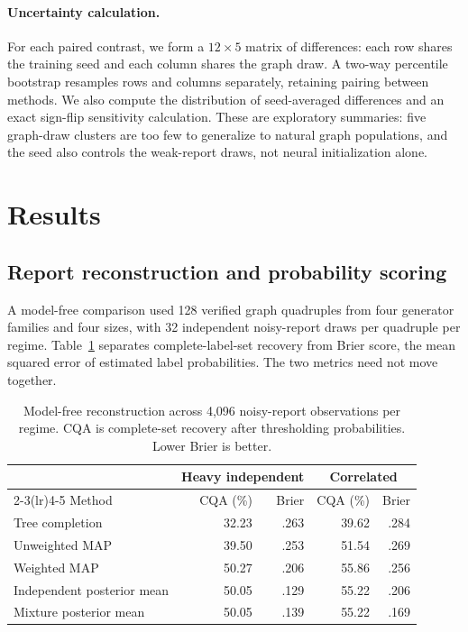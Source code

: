 \documentclass[10pt]{article}
\begin{document}
\paragraph{Uncertainty calculation.} For each paired contrast, we form a $12\times 5$ matrix of differences: each row shares the training seed and each column shares the graph draw. A two-way percentile bootstrap resamples rows and columns separately, retaining pairing between methods. We also compute the distribution of seed-averaged differences and an exact sign-flip sensitivity calculation. These are exploratory summaries: five graph-draw clusters are too few to generalize to natural graph populations, and the seed also controls the weak-report draws, not neural initialization alone.

\section{Results}
\subsection{Report reconstruction and probability scoring}
A model-free comparison used 128 verified graph quadruples from four generator families and four sizes, with 32 independent noisy-report draws per quadruple per regime. Table~\ref{tab:decode} separates complete-label-set recovery from Brier score, the mean squared error of estimated label probabilities. The two metrics need not move together.

\begin{table}[h]
\centering\small
\caption{Model-free reconstruction across 4,096 noisy-report observations per regime. CQA is complete-set recovery after thresholding probabilities. Lower Brier is better.}
\label{tab:decode}
\begin{tabular}{lrrrr}
\toprule
 & \multicolumn{2}{c}{Heavy independent} & \multicolumn{2}{c}{Correlated}\\
\cmidrule(lr){2-3}\cmidrule(lr){4-5}
Method & CQA (\%) & Brier & CQA (\%) & Brier\\
\midrule
Tree completion & 32.23 & .263 & 39.62 & .284 \\
Unweighted MAP & 39.50 & .253 & 51.54 & .269 \\
Weighted MAP & 50.27 & .206 & 55.86 & .256 \\
Independent posterior mean & 50.05 & .129 & 55.22 & .206 \\
Mixture posterior mean & 50.05 & .139 & 55.22 & .169 \\
\bottomrule
\end{tabular}
\end{table}
\end{document}
